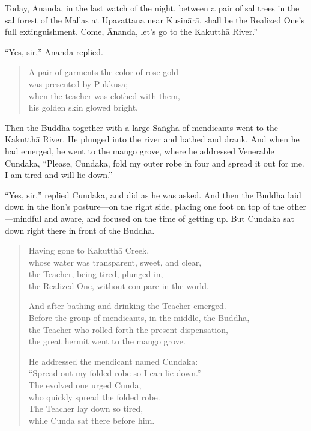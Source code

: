 \documentclass[12pt,openany]{book}%
\begin{document}
Today, Ānanda, in the last watch of the night, between a pair of sal trees in the sal forest of the Mallas at Upavattana near \textsanskrit{Kusinārā}, shall be the Realized One’s full extinguishment. Come, Ānanda, let’s go to the \textsanskrit{Kakutthā} River.” 

“Yes, sir,” Ānanda replied. 

\begin{verse}%
A pair of garments the color of rose-gold \\
was presented by Pukkusa; \\
when the teacher was clothed with them, \\
his golden skin glowed bright. 

%
\end{verse}

Then the Buddha together with a large \textsanskrit{Saṅgha} of mendicants went to the \textsanskrit{Kakutthā} River. He plunged into the river and bathed and drank. And when he had emerged, he went to the mango grove, where he addressed Venerable Cundaka, “Please, Cundaka, fold my outer robe in four and spread it out for me. I am tired and will lie down.” 

“Yes, sir,” replied Cundaka, and did as he was asked. And then the Buddha laid down in the lion’s posture—on the right side, placing one foot on top of the other—mindful and aware, and focused on the time of getting up. But Cundaka sat down right there in front of the Buddha. 

\begin{verse}%
Having gone to \textsanskrit{Kakutthā} Creek, \\
whose water was transparent, sweet, and clear, \\
the Teacher, being tired, plunged in, \\
the Realized One, without compare in the world. 

And after bathing and drinking the Teacher emerged. \\
Before the group of mendicants, in the middle, the Buddha, \\
the Teacher who rolled forth the present dispensation, \\
the great hermit went to the mango grove. 

He addressed the mendicant named Cundaka: \\
“Spread out my folded robe so I can lie down.” \\
The evolved one urged Cunda, \\
who quickly spread the folded robe. \\
The Teacher lay down so tired, \\
while Cunda sat there before him. 

%
\end{verse}
\end{document}

